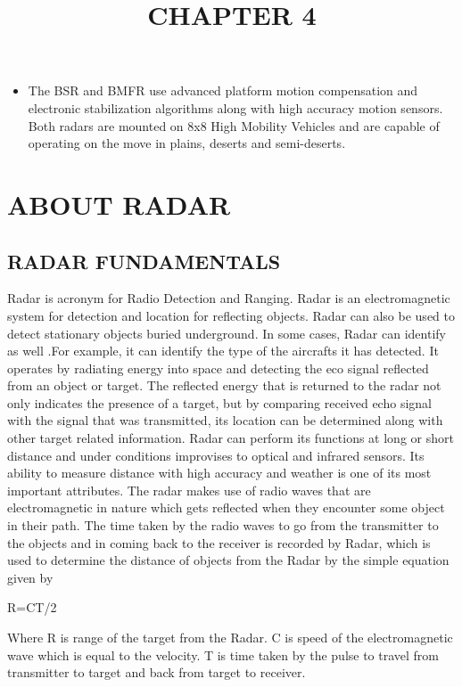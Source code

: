 \documentclass[12pt]{article} %
\begin{document}
\begin{itemize}
\item The BSR and BMFR use advanced platform motion compensation and electronic stabilization algorithms along with high accuracy motion sensors. Both radars are mounted on 8x8 High Mobility Vehicles and are capable of operating on the move in plains, deserts and semi-deserts.
\end{itemize}

\title{\textbf{\huge {CHAPTER 4}}}
\maketitle
\section {ABOUT RADAR}

\subsection{RADAR FUNDAMENTALS}
Radar is acronym for Radio Detection and Ranging. Radar is an electromagnetic system for detection and location for reflecting objects. Radar can also be used to detect stationary objects buried underground. In some cases, Radar can identify as well .For example, it can identify the type of the aircrafts it has detected. It operates by radiating energy into space and detecting the eco signal reflected from an object or target. The reflected energy that is returned to the radar not only indicates the presence of a target, but by comparing received echo signal with the signal that was transmitted, its location can be determined along with other target related information. Radar can perform its functions at long or short distance and  under conditions improvises to optical and infrared sensors. Its ability to measure distance with high accuracy and weather is one of its most important attributes. The radar makes use of radio waves that are electromagnetic in nature which gets reflected when they encounter some object in their path. 
The time taken by the radio waves to go from the transmitter to the objects and in coming back to the receiver is recorded by Radar, which is used to determine the distance of objects from the Radar by the simple equation given by
 \begin{center}                                             
    R=CT/2
 \end{center}
Where R is range of the target from the Radar.
 C is speed of the electromagnetic wave which is equal to the velocity.
 T is time taken by the pulse to travel from transmitter to target and back from target to receiver.
\end{document}
